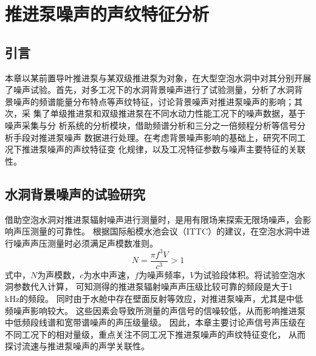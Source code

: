 \chapter{推进泵噪声的声纹特征分析}\label{ch:chapter3}
\section{引言}
\begin{comment}
本文以紧凑型前置导叶的单级推进泵和新型结构的双级推进泵为研究对象，
在大型空泡水洞中对其进行噪声试验研究。
目的在于阐明推进泵辐射噪声特性与航速之间的声学关联性，以及丰富推进泵声指纹特征的内涵。

试验中通过固定叶轮转速、改变水洞流速的方法，从而获得推进泵在不同水动力性能工况下的噪声数据。
由于水洞测试的局限性会影响推进泵中低频段辐射噪声的声压级量级，所测声信号的信噪比较低。
因此在研究中对多工况下的水洞背景噪声
进行了试验测量，分析了水洞背景噪声的频谱特性和特征频段能量分布，
讨论背景噪声对推进泵噪声的影响；其次，采集了单级推进泵和双级推进泵在不
同水动力性能工况下的噪声数据，基于噪声采集与分析系统的分析模块，借助频谱分析
和三分之一倍频程分析等信号分析手段对推进泵噪声数据进行处理。在考虑背景噪声影
响的基础上，研究不同工况下推进泵噪声的声纹特征变化，以及流速等与噪声的声学关
联性，探讨推进泵噪声的声纹特征。
\end{comment}
本章以某前置导叶推进泵与某双级推进泵为对象，在大型空泡水洞中对其分别开展
了噪声试验。首先，对多工况下的水洞背景噪声进行了试验测量，分析了水洞背
景噪声的频谱能量分布特点等声纹特征，讨论背景噪声对推进泵噪声的影响；其次，采
集了单级推进泵和双级推进泵在不同水动力性能工况下的噪声数据，基于噪声采集与分
析系统的分析模块，借助频谱分析和三分之一倍频程分析等信号分析手段对推进泵噪声
数据进行处理。在考虑背景噪声影响的基础上，研究不同工况下推进泵噪声的声纹特征变
化规律，以及工况特征参数与噪声主要特征的关联性。
\section{水洞背景噪声的试验研究}
借助空泡水洞对推进泵辐射噪声进行测量时，是用有限场来探索无限场噪声，会影响声压测量的可靠性。
根据国际船模水池会议（ITTC）的建议，在空泡水洞中进行噪声声压测量时必须满足声模数准则\cite{曾赛2018试验研究}。
\begin{equation}
    \label{equ:shuidong}
    N=\frac{\pi f^3V}{c^3} > 1
\end{equation}
式中，$N$为声模数，$c$为水中声速，$f$为噪声频率，$V$为试验段体积。将试验空泡水洞参数代入计算，
可知测得的推进泵辐射噪声声压级比较可靠的频段是大于1 \,kHz的频段。
同时由于水舱中存在壁面反射等效应，对推进泵噪声，尤其是中低频噪声影响较大。
这些因素会导致所测量的声信号的信噪较低，从而影响推进泵中低频段线谱和宽带谱噪声的声压级量级。
因此，本章主要讨论声信号声压级在不同工况下的相对量级，重点关注不同工况下推进泵噪声的声纹特征变化，
从而探讨流速与推进泵噪声的声学关联性。

